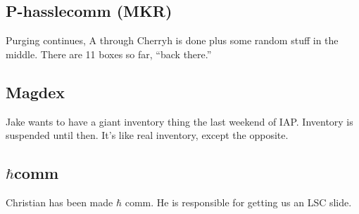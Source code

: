 \documentclass[10pt]{article}
\begin{document}
\subsection*{P-hasslecomm (MKR)}
Purging continues, A through Cherryh is done plus some random
stuff in the middle.  There are 11 boxes so far, ``back there.''

\subsection*{Magdex}
Jake wants to have a giant inventory thing the last weekend of IAP.
Inventory is suspended until then.  It's like real inventory, except
the opposite.

\subsection*{$\hbar$comm}
Christian has been made $\hbar$ comm.  He is responsible for getting
us an LSC slide.







\end{document}
